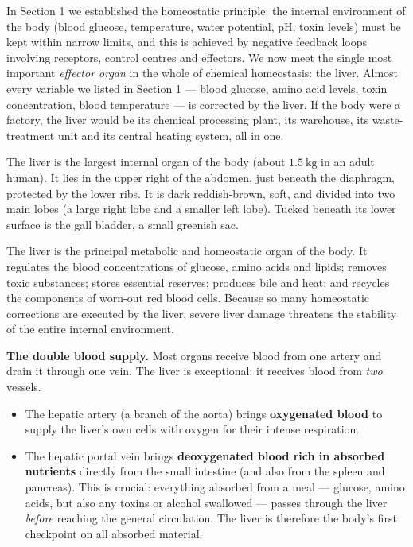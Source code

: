 \documentclass[11pt]{article}
\newcommand{\cle}[1]{{\popxbold\color{popdark}#1}}
\newcounter{popsec}
\newcounter{popsub}
\newcommand{\courssub}[1]{%
  \stepcounter{popsub}%
  \par\vspace{9pt}\noindent{\popxbold\fontsize{11.5}{13}\selectfont\color{popink}{\color{poporange}\thepopsec.\thepopsub}\hspace{6pt}#1}\par\nopagebreak\vspace{4pt}
}
\begin{document}
In Section 1 we established the \cle{homeostatic principle}: the internal environment of the body (blood glucose, temperature, water potential, pH, toxin levels) must be kept within narrow limits, and this is achieved by \cle{negative feedback} loops involving receptors, control centres and effectors. We now meet the single most important \emph{effector organ} in the whole of chemical homeostasis: the \cle{liver}. Almost every variable we listed in Section 1 — blood glucose, amino acid levels, toxin concentration, blood temperature — is corrected by the liver. If the body were a factory, the liver would be its chemical processing plant, its warehouse, its waste-treatment unit and its central heating system, all in one.

\courssub{Position and Gross Structure of the Liver}

The \cle{liver} is the largest internal organ of the body (about $1.5\ \mathrm{kg}$ in an adult human). It lies in the upper right of the abdomen, just beneath the diaphragm, protected by the lower ribs. It is dark reddish-brown, soft, and divided into two main lobes (a large right lobe and a smaller left lobe). Tucked beneath its lower surface is the \cle{gall bladder}, a small greenish sac.

\begin{propriete}
The liver is the principal \cle{metabolic} and \cle{homeostatic} organ of the body. It regulates the blood concentrations of glucose, amino acids and lipids; removes toxic substances; stores essential reserves; produces bile and heat; and recycles the components of worn-out red blood cells. Because so many homeostatic corrections are executed by the liver, severe liver damage threatens the stability of the entire internal environment.
\end{propriete}

\textbf{The double blood supply.} Most organs receive blood from one artery and drain it through one vein. The liver is exceptional: it receives blood from \emph{two} vessels.

\begin{itemize}
\item The \cle{hepatic artery} (a branch of the aorta) brings \textbf{oxygenated blood} to supply the liver's own cells with oxygen for their intense respiration.
\item The \cle{hepatic portal vein} brings \textbf{deoxygenated blood rich in absorbed nutrients} directly from the small intestine (and also from the spleen and pancreas). This is crucial: everything absorbed from a meal — glucose, amino acids, but also any toxins or alcohol swallowed — passes through the liver \emph{before} reaching the general circulation. The liver is therefore the body's first checkpoint on all absorbed material.
\end{itemize}
\end{document}
